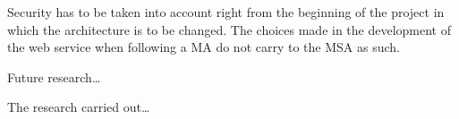\begin{sloppypar}
    Security has to be taken into account right from the beginning of the 
    project in which the architecture is to be changed. The choices made in the 
    development of the web service when following a MA do not carry to the MSA 
    as such.
\end{sloppypar}
\begin{sloppypar}
    Future research\dots
\end{sloppypar}
\begin{sloppypar}
    The research carried out\dots
\end{sloppypar}



